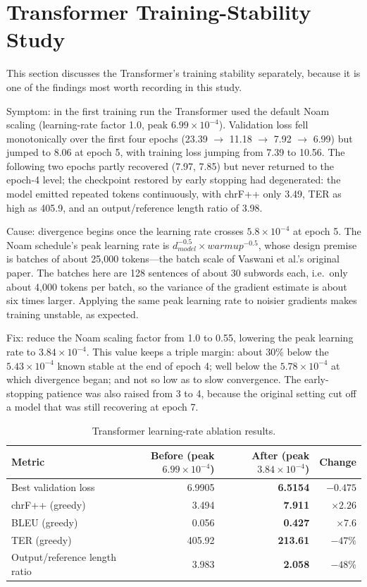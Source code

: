 \documentclass[a4paper,12pt]{vpcoe}
\begin{document}
\section{Transformer Training-Stability Study}
This section discusses the Transformer's training stability separately, because it is one of the findings most worth recording in this study.

Symptom: in the first training run the Transformer used the default Noam scaling (learning-rate factor 1.0, peak $6.99\times10^{-4}$). Validation loss fell monotonically over the first four epochs (23.39 $\rightarrow$ 11.18 $\rightarrow$ 7.92 $\rightarrow$ 6.99) but jumped to 8.06 at epoch 5, with training loss jumping from 7.39 to 10.56. The following two epochs partly recovered (7.97, 7.85) but never returned to the epoch-4 level; the checkpoint restored by early stopping had degenerated: the model emitted repeated tokens continuously, with chrF++ only 3.49, TER as high as 405.9, and an output/reference length ratio of 3.98.

Cause: divergence begins once the learning rate crosses $5.8\times10^{-4}$ at epoch 5. The Noam schedule's peak learning rate is $d_{model}^{-0.5}\times warmup^{-0.5}$, whose design premise is batches of about 25,000 tokens---the batch scale of Vaswani et al.'s original paper. The batches here are 128 sentences of about 30 subwords each, i.e.\ only about 4,000 tokens per batch, so the variance of the gradient estimate is about six times larger. Applying the same peak learning rate to noisier gradients makes training unstable, as expected.

Fix: reduce the Noam scaling factor from 1.0 to 0.55, lowering the peak learning rate to $3.84\times10^{-4}$. This value keeps a triple margin: about 30\% below the $5.43\times10^{-4}$ known stable at the end of epoch 4; well below the $5.78\times10^{-4}$ at which divergence began; and not so low as to slow convergence. The early-stopping patience was also raised from 3 to 4, because the original setting cut off a model that was still recovering at epoch 7.

\begin{table}[h]
\centering
\caption{Transformer learning-rate ablation results.}
\label{tab:lr}
\begin{tabular}{@{}lrrr@{}}
\toprule
Metric & Before (peak $6.99\times10^{-4}$) & After (peak $3.84\times10^{-4}$) & Change \\
\midrule
Best validation loss & 6.9905 & \textbf{6.5154} & $-0.475$ \\
chrF++ (greedy) & 3.494 & \textbf{7.911} & $\times2.26$ \\
BLEU (greedy) & 0.056 & \textbf{0.427} & $\times7.6$ \\
TER (greedy) & 405.92 & \textbf{213.61} & $-47\%$ \\
Output/reference length ratio & 3.983 & \textbf{2.058} & $-48\%$ \\
\bottomrule
\end{tabular}
\end{table}
\end{document}
